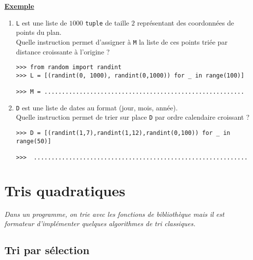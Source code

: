 \documentclass[a4paper, french, 12pt]{article}  %
\newcounter{thme}
\newcounter{exple}
\newenvironment{exemple}[1]
{\par \medskip  \noindent \addtocounter{exple}{1} \underline{\textbf{Exemple} \textbf{\theexple} } \hspace{0.5cm}{\itshape #1} \vspace*{10pt} \par}
{\par \medskip }
\newcounter{alg}
\begin{document}
\newpage

\begin{exemple}{}

\begin{enumerate}
	\item \lstinline+L+ est une liste de $1000$ \lstinline+tuple+ de taille $2$ représentant des coordonnées de points du plan. \\
	Quelle instruction permet d'assigner à  \lstinline+M+  la liste de ces points triée  par distance croissante à l'origine  ?
	
	\begin{lstlisting}
>>> from random import randint
>>> L = [(randint(0, 1000), randint(0,1000)) for _ in range(100)]

>>> M = .........................................................

	\end{lstlisting}
	
  \item \lstinline+D+ est une liste de dates au format (jour, mois, année). \\  
Quelle instruction permet de trier sur place \lstinline+D+  par ordre calendaire croissant ?

	\begin{lstlisting}
>>> D = [(randint(1,7),randint(1,12),randint(0,100)) for _ in range(50)]

>>>  .............................................................
	\end{lstlisting}
	
\end{enumerate}


\end{exemple}

\section{Tris quadratiques}

{\itshape Dans un programme, on trie avec les fonctions de bibliothèque mais il est formateur d'implémenter quelques algorithmes de tri classiques.}


\subsection{Tri par sélection}
\end{document}
